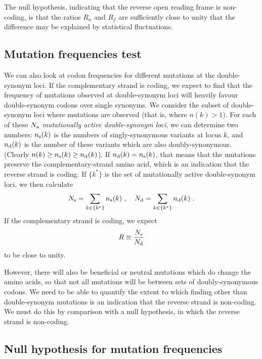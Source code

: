 \documentclass[unnumsec,webpdf,contemporary,large,namedate]{oup-authoring-template}%
\theoremstyle{thmstyleone}%
\theoremstyle{thmstyletwo}%
\theoremstyle{thmstylethree}%
\begin{document}
The null hypothesis, indicating that the reverse open reading frame is 
non-coding, is that the ratios $R_n$ and $R_f$ are sufficiently close to 
unity that the difference may be explained by statistical fluctuations. 

\subsection{Mutation frequencies test}
\label{sec: 4.2}

We can also look at codon frequencies for different mutations at the double-synonym loci. 
If the complementary strand is coding, we expect to find that the frequency of mutations 
observed at double-synonym loci will heavily favour double-synonym codons over 
single synonyms.  We consider the subset of double-synonym loci where mutations 
are observed (that is, where $n(k)>1$). For each of these $N_{\rm a}$ \emph{mutationally 
active double-synonym loci}, we can determine two numbers: $n_{\rm s}(k)$ is 
the numbers of singly-synonymous variants at locus $k$, and $n_{\rm d}(k)$ is the number 
of these variants which are also doubly-synonymous. (Clearly $n(k)\ge n_{\rm s}(k)\ge n_{\rm d}(k)$). 
If $n_{\rm d}(k)=n_{\rm s}(k)$, that means that the mutations preserve the complementary-strand 
amino acid, which is an indication that the reverse strand is coding. If $\{k^\ast\}$ 
is the set of mutationally active double-synonym loci, we then
calculate
%
\begin{equation}
\label{eq: 4.2}
N_{\rm s}=\sum_{k\in\{k^\ast\}} n_{\rm s}(k)
\ ,\ \ \ 
N_{\rm d}=\sum_{k\in\{k^\ast\}} n_{\rm d}(k)
\ .
\end{equation}
%
If the complementary strand is coding, we expect 
%
\begin{equation}
\label{eq: 4.3}
R\equiv \frac{N_{\rm s}}{N_{\rm d}}
\end{equation}
%
to be close to unity.

However, there will also be beneficial 
or neutral mutations which do change the amino acids, so that not all mutations 
will be between sets of doubly-synonymous codons. We need to be able to 
quantify the extent to which finding other than double-synonym mutations is 
an indication that the reverse strand is non-coding. We must do this by comparison with 
a null hypothesis, in which the reverse strand is non-coding. 

\subsection{Null hypothesis for mutation frequencies}
\label{sec: 4.3}
\end{document}
